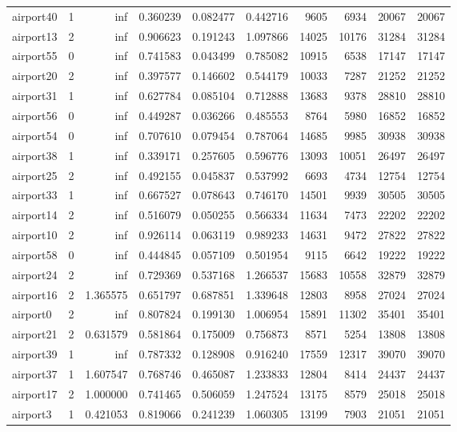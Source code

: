 \begin{longtable}{|l|r|r|r|r|r|r|r|r|r|}
airport40 & 1 & inf & 0.360239 & 0.082477 & 0.442716 & 9605 & 6934 & 20067 & 20067 \\
airport13 & 2 & inf & 0.906623 & 0.191243 & 1.097866 & 14025 & 10176 & 31284 & 31284 \\
airport55 & 0 & inf & 0.741583 & 0.043499 & 0.785082 & 10915 & 6538 & 17147 & 17147 \\
airport20 & 2 & inf & 0.397577 & 0.146602 & 0.544179 & 10033 & 7287 & 21252 & 21252 \\
airport31 & 1 & inf & 0.627784 & 0.085104 & 0.712888 & 13683 & 9378 & 28810 & 28810 \\
airport56 & 0 & inf & 0.449287 & 0.036266 & 0.485553 & 8764 & 5980 & 16852 & 16852 \\
airport54 & 0 & inf & 0.707610 & 0.079454 & 0.787064 & 14685 & 9985 & 30938 & 30938 \\
airport38 & 1 & inf & 0.339171 & 0.257605 & 0.596776 & 13093 & 10051 & 26497 & 26497 \\
airport25 & 2 & inf & 0.492155 & 0.045837 & 0.537992 & 6693 & 4734 & 12754 & 12754 \\
airport33 & 1 & inf & 0.667527 & 0.078643 & 0.746170 & 14501 & 9939 & 30505 & 30505 \\
airport14 & 2 & inf & 0.516079 & 0.050255 & 0.566334 & 11634 & 7473 & 22202 & 22202 \\
airport10 & 2 & inf & 0.926114 & 0.063119 & 0.989233 & 14631 & 9472 & 27822 & 27822 \\
airport58 & 0 & inf & 0.444845 & 0.057109 & 0.501954 & 9115 & 6642 & 19222 & 19222 \\
airport24 & 2 & inf & 0.729369 & 0.537168 & 1.266537 & 15683 & 10558 & 32879 & 32879 \\
airport16 & 2 & 1.365575 & 0.651797 & 0.687851 & 1.339648 & 12803 & 8958 & 27024 & 27024 \\
airport0 & 2 & inf & 0.807824 & 0.199130 & 1.006954 & 15891 & 11302 & 35401 & 35401 \\
airport21 & 2 & 0.631579 & 0.581864 & 0.175009 & 0.756873 & 8571 & 5254 & 13808 & 13808 \\
airport39 & 1 & inf & 0.787332 & 0.128908 & 0.916240 & 17559 & 12317 & 39070 & 39070 \\
airport37 & 1 & 1.607547 & 0.768746 & 0.465087 & 1.233833 & 12804 & 8414 & 24437 & 24437 \\
airport17 & 2 & 1.000000 & 0.741465 & 0.506059 & 1.247524 & 13175 & 8579 & 25018 & 25018 \\
airport3 & 1 & 0.421053 & 0.819066 & 0.241239 & 1.060305 & 13199 & 7903 & 21051 & 21051 \\

\end{longtable}

